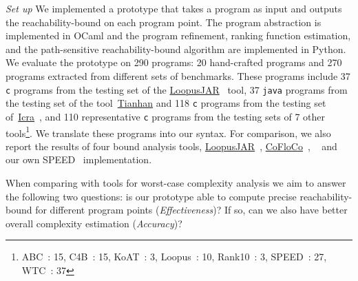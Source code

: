\emph{Set up} We implemented a prototype {\PSRB} that takes a program as input 
and outputs the reachability-bound on each program point.
The 
program abstraction is implemented in OCaml and the program refinement, ranking function estimation, and the path-sensitive reachability-bound algorithm are implemented in Python.
We evaluate the prototype on 290 programs: 20 hand-crafted programs and 270 programs extracted from different sets of benchmarks. 
These programs include  37 {\tt c} programs 
from the testing set of the \hyperlink{https://forsyte.at/static/people/sinn/loopusJAR/index.html}{LoopusJAR}~\cite{BenchmarkLoopus} tool,
37 {\tt java} programs from the testing set of the tool~\hyperlink{https://zenodo.org/record/5140586\#.Y5pBoC-B1QI}{Tianhan}\cite{BenchmarkTianhan,LuCT21} 
and 118 {\tt c} programs from the testing set of~\hyperlink{https://github.com/icra-team/icra}{Icra}~\cite{BenchmarkIcra,KincaidBCR19,CyphertBKR19}, and 110 representative {\tt c} programs from the testing sets of 7 other tools\footnote{ABC~\cite{BenchmarkABC}: 15, C4B~\cite{BenchmarkC4B}: 15, KoAT~\cite{BenchmarkKoAt}: 3, Loopus~\cite{BenchmarkLoopus}: 10, Rank10~\cite{BenchmarkRank}: 3, SPEED~\cite{GulwaniJK09,GulwaniZ10,GulwaniMC09}: 27, WTC~\cite{BenchmarkLoopus}: 37}.
%
We translate these programs into our syntax.
For comparison, we also report the results of four bound analysis tools, 
\hyperlink{https://forsyte.at/software/loopus/}{LoopusJAR}~\cite{SinnZV17},
\hyperlink{https://github.com/aeflores/CoFloCo/tree/master/src}{CoFloCo}~\cite{ToolCofloco},
~\cite{BenchmarkTianhan}
and our own SPEED~\cite{GulwaniJK09} implementation.

When comparing with tools for worst-case
complexity analysis we aim to answer the following two questions: is our prototype able to compute precise reachability-bound for different program points (\emph{Effectiveness})? If so, can we also have better overall complexity estimation (\emph{Accuracy})?

